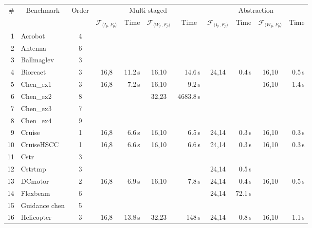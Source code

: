 \documentclass[twocolumn]{autart}    %
\newcommand{\xmark}{\ding{55}}
\begin{document}
\begin{table}
\centering
\begin{tabular}{| r | l | c | c | r | c | r | c | r | c | r |}
%
\hline
\# & \multicolumn{1}{|c|}{Benchmark} & \multicolumn{1}{|c|}{Order} & \multicolumn{4}{|c|}{Multi-staged}                 & \multicolumn{4}{|c|}{Abstraction} \\
   &                                  & & \multicolumn{1}{|c|}{$\mathcal{F}_{\langle I_p,F_p \rangle}$} & \multicolumn{1}{|c|}{Time} & \multicolumn{1}{|c|}{$\mathcal{F}_{\langle W_p, F_p \rangle}$} & \multicolumn{1}{|c|}{Time} & \multicolumn{1}{|c|}{$\mathcal{F}_{\langle I_p,F_p \rangle}$} & \multicolumn{1}{|c|}{Time} & \multicolumn{1}{|c|}{$\mathcal{F}_{\langle W_p, F_p \rangle}$} & \multicolumn{1}{|c|}{Time}\\\hline
1  & Acrobot  & 4 &  & \xmark &  & ~\xmark & & ~\xmark &  & ~\xmark \\
2  & Antenna  & 6 &  & ~\xmark &  & ~\xmark & & ~\xmark & & ~\xmark\\
3  & Ballmaglev  & 3 &  & ~\xmark &  & ~\xmark & & ~\xmark & & ~\xmark\\
4  & Bioreact & 3 & 16,8 & 11.2\,s & 16,10 &14.6\,s & 24,14 & 0.4\,s & 16,10 & 0.5\,s\\
5  & Chen\_ex1& 3 & 16,8 & 7.2\,s  & 16,10 & 9.2\,s & & ~\xmark & 16,10 & 1.4\,s\\
6  & Chen\_ex2 & 8& & ~\xmark & 32,23 & 4683.8\,s &  & ~\xmark & & ~\xmark\\
7  & Chen\_ex3 & 7 &   & ~\xmark & & ~\xmark & & ~\xmark & & ~\xmark\\
8  & Chen\_ex4 & 9 & & ~\xmark & & ~\xmark & & ~\xmark & & ~\xmark\\
9  & Cruise    & 1 & 16,8 & 6.6\,s & 16,10 & 6.5\,s & 24,14 & 0.3\,s& 16,10 & 0.3\,s\\
10 & CruiseHSCC & 1 & 16,8 & 6.6\,s & 16,10 & 6.6\,s &  24,14 & 0.3\,s & 16,10 & 0.3\,s \\
11 & Cstr & 3 & & ~\xmark & & ~\xmark & & ~\xmark & & ~\xmark\\
12 & Cstrtmp  & 3 &  & ~\xmark & & ~\xmark & 24,14 & 0.5\,s & & ~\xmark\\
13 & DCmotor   & 2 & 16,8  & 6.9\,s & 16,10 & 7.8\,s & 24,14 & 0.4\,s & 16,10 & 0.5\,s \\
14 & Flexbeam   & 6 & & ~\xmark & & ~\xmark & 24,14 & 72.1\,s & & ~\xmark\\
15 & Guidance chen  & 5 & & ~\xmark & & ~\xmark & & ~\xmark & & ~\xmark\\
16 & Helicopter   & 3 & 16,8 & 13.8\,s & 32,23 & 148\,s & 24,14 & 0.8\,s& 16,10 & 1.1\,s\\

\end{tabular}
\end{table}
\end{document}
